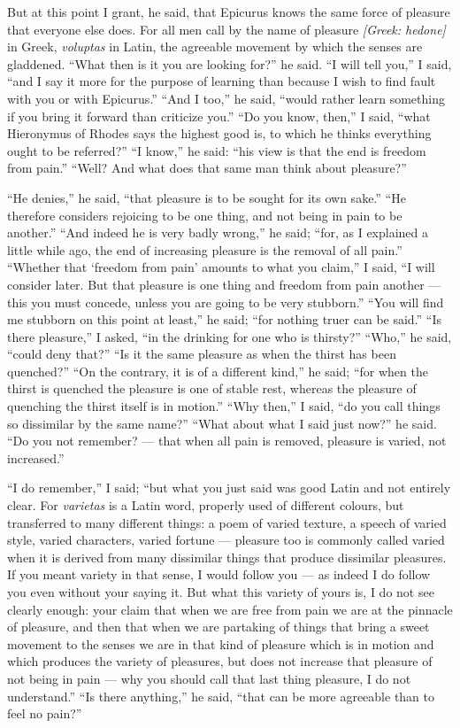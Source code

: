  But at this point I grant, he said, that Epicurus knows the same force of pleasure that everyone else does. For all men call by the name of pleasure \textit{[Greek: hedone]} in Greek, \textit{voluptas} in Latin, the agreeable movement by which the senses are gladdened. ``What then is it you are looking for?'' he said. ``I will tell you,'' I said, ``and I say it more for the purpose of learning than because I wish to find fault with you or with Epicurus.'' ``And I too,'' he said, ``would rather learn something if you bring it forward than criticize you.'' ``Do you know, then,'' I said, ``what Hieronymus of Rhodes says the highest good is, to which he thinks everything ought to be referred?'' ``I know,'' he said: ``his view is that the end is freedom from pain.'' ``Well? And what does that same man think about pleasure?''

 ``He denies,'' he said, ``that pleasure is to be sought for its own sake.'' ``He therefore considers rejoicing to be one thing, and not being in pain to be another.'' ``And indeed he is very badly wrong,'' he said; ``for, as I explained a little while ago, the end of increasing pleasure is the removal of all pain.'' ``Whether that `freedom from pain' amounts to what you claim,'' I said, ``I will consider later. But that pleasure is one thing and freedom from pain another — this you must concede, unless you are going to be very stubborn.'' ``You will find me stubborn on this point at least,'' he said; ``for nothing truer can be said.'' ``Is there pleasure,'' I asked, ``in the drinking for one who is thirsty?'' ``Who,'' he said, ``could deny that?'' ``Is it the same pleasure as when the thirst has been quenched?'' ``On the contrary, it is of a different kind,'' he said; ``for when the thirst is quenched the pleasure is one of stable rest, whereas the pleasure of quenching the thirst itself is in motion.'' ``Why then,'' I said, ``do you call things so dissimilar by the same name?'' ``What about what I said just now?'' he said. ``Do you not remember? — that when all pain is removed, pleasure is varied, not increased.''

 ``I do remember,'' I said; ``but what you just said was good Latin and not entirely clear. For \textit{varietas} is a Latin word, properly used of different colours, but transferred to many different things: a poem of varied texture, a speech of varied style, varied characters, varied fortune — pleasure too is commonly called varied when it is derived from many dissimilar things that produce dissimilar pleasures. If you meant variety in that sense, I would follow you — as indeed I do follow you even without your saying it. But what this variety of yours is, I do not see clearly enough: your claim that when we are free from pain we are at the pinnacle of pleasure, and then that when we are partaking of things that bring a sweet movement to the senses we are in that kind of pleasure which is in motion and which produces the variety of pleasures, but does not increase that pleasure of not being in pain — why you should call that last thing pleasure, I do not understand.'' ``Is there anything,'' he said, ``that can be more agreeable than to feel no pain?''

